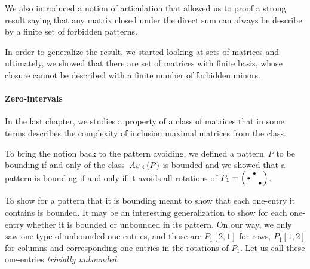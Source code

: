 We also introduced a notion of articulation that allowed us to proof a strong result saying that any matrix closed under the direct sum can always be describe by a finite set of forbidden patterns.

In order to generalize the result, we started looking at sets of matrices and ultimately, we showed that there are set of matrices with finite basis, whose closure cannot be described with a finite number of forbidden minors.

\paragraph{Zero-intervals}
In the last chapter, we studies a property of a class of matrices that in some terms describes the complexity of inclusion maximal matrices from the class.

To bring the notion back to the pattern avoiding, we defined a pattern~$P$ to be bounding if and only of the class~$Av_{\preceq}\left(P\right)$ is bounded and we showed that a pattern is bounding if and only if it avoids all rotations of $P_1=\left(\begin{smallmatrix} &\bullet& \\\bullet& & \\ & &\bullet\end{smallmatrix}\right)$.

To show for a pattern that it is bounding meant to show that each one-entry it contains is bounded. It may be an interesting generalization to show for each one-entry whether it is bounded or unbounded in its pattern. On our way, we only saw one type of unbounded one-entries, and those are $P_1[2,1]$ for rows, $P_1[1,2]$ for columns and corresponding one-entries in the rotations of $P_1$. Let us call these one-entries \emph{trivially unbounded}.

